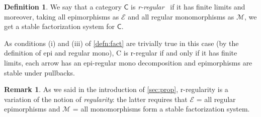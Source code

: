 \documentclass{article}
\theoremstyle{definition}
\newtheorem{defn}{Definition}
\newtheorem{rem}{Remark}
\begin{document}
\begin{defn}
We say that a category $\mathsf{C}$ is \emph{r-regular}~\cite{Ghi-Zaw} if it has finite limits and moreover, taking all epimorphisms as $\mathcal{E}$ and all regular monomorphisms as $\mathcal{M}$, we get a stable factorization system for $\mathsf{C}$.
\end{defn}
As conditions (i) and (iii) of \cref{defn:fact} are trivially true in this case (by the definition of epi and regular mono), C is r-regular if and only if it has finite limits, each arrow has an epi-regular mono decomposition and epimorphisms are stable under pullbacks.

\begin{rem}\label{rem:reg}
As we said in the introduction of \cref{sec:prop}, r-regularity is a variation of the notion of \emph{regularity}: the latter requires that $\mathcal{E}$ = all regular epimorphisms and $\mathcal{M}$ = all monomorphisms form a stable factorization system.
\end{rem}
\end{document}
